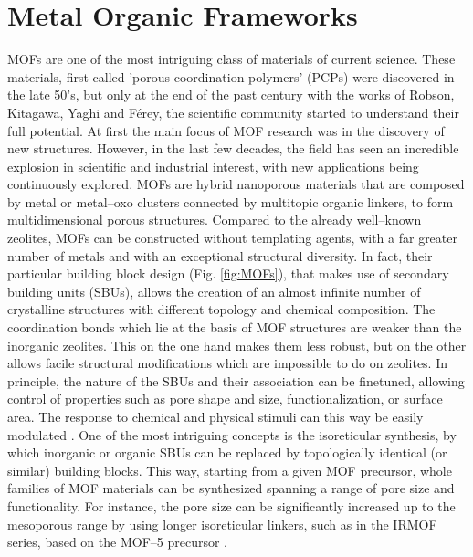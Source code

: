 \section{Metal Organic Frameworks}
MOFs are one of the most intriguing class of materials of current science. These materials, first called 'porous coordination polymers' (PCPs) were discovered in the late 50's, but only at the end of the past century with the works of Robson\cite{batten1995two,hoskins1990design}, Kitagawa\cite{kitagawa1991synthesis, kitagawa1993synthesis}, Yaghi\cite{yaghi1995hydrothermal} and F\'{e}rey\cite{riou1998hybrid}, the scientific community started to understand their full potential. At first the main focus of MOF research was in the discovery of new structures. However, in the last few decades, the field has seen an incredible explosion in scientific and industrial interest, with new applications being continuously explored\cite{furukawa2013chemistry}. MOFs are hybrid nanoporous materials that are composed by metal or metal--oxo clusters connected by multitopic organic linkers, to form multidimensional porous structures. Compared to the already well--known zeolites, MOFs can be constructed without templating agents, with a far greater number of metals and with an exceptional structural diversity. In fact, their particular building block design (Fig. \ref{fig:MOFs}), that makes use of secondary building units (SBUs), allows the creation of an almost infinite number of crystalline structures with different topology and chemical composition. The coordination bonds which lie at the basis of MOF structures are weaker than the inorganic zeolites. This on the one hand makes them less robust, but on the other allows facile structural modifications which are impossible to do on zeolites. In principle, the nature of the SBUs and their association can be finetuned\cite{stock2011synthesis}, allowing control of properties such as pore shape and size, functionalization, or surface area. The response to chemical and physical stimuli can this way be easily modulated \cite{zhou2014metal,zhou2012introduction}. 
One of the most intriguing concepts is the isoreticular synthesis, by which inorganic or organic SBUs can be replaced by topologically identical (or similar) building blocks. This way, starting from a given MOF precursor, whole families of MOF materials can be synthesized spanning a range of pore size and functionality. For instance, the pore size can be significantly increased up to the mesoporous range by using longer isoreticular linkers, such as in the IRMOF series, based on the MOF--5 precursor \cite{eddaoudi2002systematic}. 
